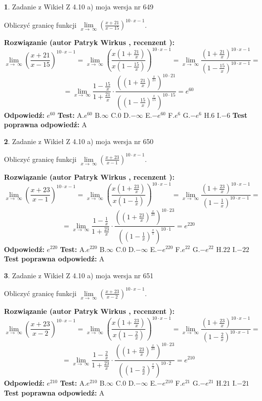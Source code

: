 \documentclass[12pt, a4paper]{article}
\theoremstyle{definition} %
\newtheorem{zad}{}
\newcommand{\zadStart}[1]{\begin{zad}#1\newline}
\newcommand{\zadStop}{\end{zad}}
\newcommand{\rozwStart}[2]{\noindent \textbf{Rozwiązanie (autor #1 , recenzent #2): }\newline}
\newcommand{\rozwStop}{\newline}
\newcommand{\odpStart}{\noindent \textbf{Odpowiedź:}\newline}
\newcommand{\odpStop}{\newline}
\newcommand{\testStart}{\noindent \textbf{Test:}\newline}
\newcommand{\testStop}{\newline}
\newcommand{\kluczStart}{\noindent \textbf{Test poprawna odpowiedź:}\newline}
\newcommand{\kluczStop}{\newline}
\begin{document}
\zadStart{Zadanie z Wikieł Z 4.10 a) moja wersja nr 649}

Obliczyć granicę funkcji  $\lim\limits_{x\to\ \infty}(\frac{x+21}{x-15})^{10\cdot x-1}$.
\zadStop
\rozwStart{Patryk Wirkus}{}
$$\lim\limits_{x\to\ \infty}(\frac{x+21}{x-15})^{10\cdot x-1} = \lim\limits_{x\to\ \infty}(\frac{x(1+\frac{21}{x})}{x(1-\frac{15}{x})})^{10\cdot x-1}=\lim\limits_{x\to\ \infty}\frac{(1+\frac{21}{x})^{10\cdot x-1}}{(1-\frac{15}{x})^{10\cdot x-1}}=$$
$$=\lim\limits_{x\to\ \infty}\frac{1-\frac{15}{x}}{1+\frac{21}{x}}\cdot\frac{((1+\frac{21}{x})^{\frac{x}{21}})^{10\cdot21}}{((1-\frac{15}{x})^{\frac{x}{15}})^{10\cdot15}}=e^{60}$$
\rozwStop
\odpStart
$e^{60}$
\odpStop
\testStart
A.$e^{60}$ B.$\infty$ C.$0$ D.$-\infty$ E.$-e^{60}$
F.$e^{6}$ G.$-e^{6}$
H.$6$
I.$-6$
\testStop
\kluczStart
A
\kluczStop



\zadStart{Zadanie z Wikieł Z 4.10 a) moja wersja nr 650}

Obliczyć granicę funkcji  $\lim\limits_{x\to\ \infty}(\frac{x+23}{x-1})^{10\cdot x-1}$.
\zadStop
\rozwStart{Patryk Wirkus}{}
$$\lim\limits_{x\to\ \infty}(\frac{x+23}{x-1})^{10\cdot x-1} = \lim\limits_{x\to\ \infty}(\frac{x(1+\frac{23}{x})}{x(1-\frac{1}{x})})^{10\cdot x-1}=\lim\limits_{x\to\ \infty}\frac{(1+\frac{23}{x})^{10\cdot x-1}}{(1-\frac{1}{x})^{10\cdot x-1}}=$$
$$=\lim\limits_{x\to\ \infty}\frac{1-\frac{1}{x}}{1+\frac{23}{x}}\cdot\frac{((1+\frac{23}{x})^{\frac{x}{23}})^{10\cdot23}}{((1-\frac{1}{x})^{\frac{x}{1}})^{10\cdot1}}=e^{220}$$
\rozwStop
\odpStart
$e^{220}$
\odpStop
\testStart
A.$e^{220}$ B.$\infty$ C.$0$ D.$-\infty$ E.$-e^{220}$
F.$e^{22}$ G.$-e^{22}$
H.$22$
I.$-22$
\testStop
\kluczStart
A
\kluczStop



\zadStart{Zadanie z Wikieł Z 4.10 a) moja wersja nr 651}

Obliczyć granicę funkcji  $\lim\limits_{x\to\ \infty}(\frac{x+23}{x-2})^{10\cdot x-1}$.
\zadStop
\rozwStart{Patryk Wirkus}{}
$$\lim\limits_{x\to\ \infty}(\frac{x+23}{x-2})^{10\cdot x-1} = \lim\limits_{x\to\ \infty}(\frac{x(1+\frac{23}{x})}{x(1-\frac{2}{x})})^{10\cdot x-1}=\lim\limits_{x\to\ \infty}\frac{(1+\frac{23}{x})^{10\cdot x-1}}{(1-\frac{2}{x})^{10\cdot x-1}}=$$
$$=\lim\limits_{x\to\ \infty}\frac{1-\frac{2}{x}}{1+\frac{23}{x}}\cdot\frac{((1+\frac{23}{x})^{\frac{x}{23}})^{10\cdot23}}{((1-\frac{2}{x})^{\frac{x}{2}})^{10\cdot2}}=e^{210}$$
\rozwStop
\odpStart
$e^{210}$
\odpStop
\testStart
A.$e^{210}$ B.$\infty$ C.$0$ D.$-\infty$ E.$-e^{210}$
F.$e^{21}$ G.$-e^{21}$
H.$21$
I.$-21$
\testStop
\kluczStart
A
\kluczStop
\end{document}
